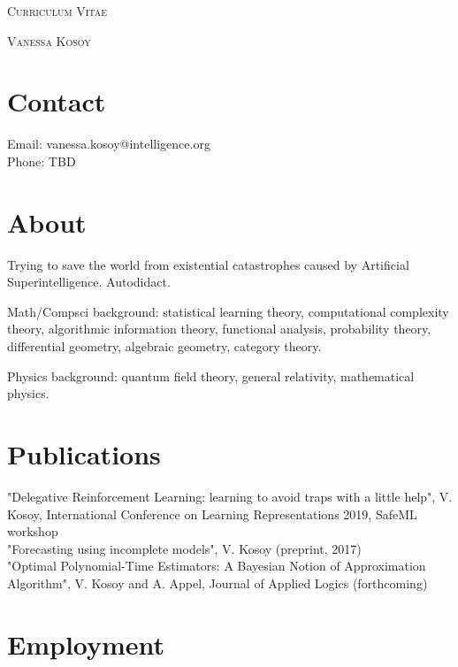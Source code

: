 \documentclass[a4paper]{article}
\begin{document}
\pagestyle{empty}

\begin{center}
\huge{\textsc{Curriculum Vitae}}
\vspace{\baselineskip}

\Large{\textsc{Vanessa Kosoy}}
\end{center}
\vspace{1.5\baselineskip}

\section{Contact}

\begin{flushleft}
  Email: vanessa.kosoy@intelligence.org \\
  Phone: TBD
\end{flushleft}

\section{About}

Trying to save the world from existential catastrophes caused by Artificial Superintelligence. Autodidact. 

Math/Compsci background: statistical learning theory, computational complexity theory, algorithmic information theory, functional analysis, probability theory, differential geometry, algebraic geometry, category theory. 

Physics background: quantum field theory, general relativity, mathematical physics.

\section{Publications}

"Delegative Reinforcement Learning: learning to avoid traps with a little help", V. Kosoy, International Conference on Learning Representations 2019, {SafeML workshop}\\

"Forecasting using incomplete models", V. Kosoy ({preprint}, 2017) \\

"Optimal Polynomial-Time Estimators: A Bayesian Notion of Approximation Algorithm", V. Kosoy and A. Appel, Journal of Applied Logics ({forthcoming})

\section{Employment}
\end{document}
